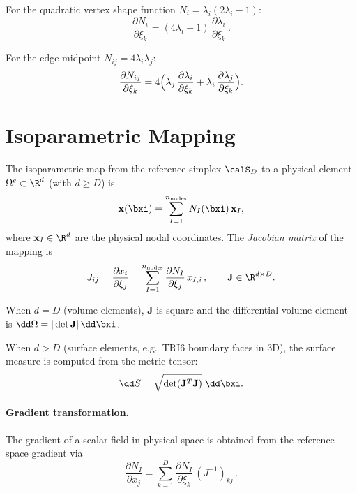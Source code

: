 For the quadratic vertex shape function $N_i = \lambda_i(2\lambda_i - 1)$:
\begin{equation}
  \frac{\partial N_i}{\partial \xi_k}
  = (4\lambda_i - 1)\,\frac{\partial \lambda_i}{\partial \xi_k}\,.
  \label{eq:dNi_vertex}
\end{equation}

For the edge midpoint $N_{ij} = 4\lambda_i\lambda_j$:
\begin{equation}
  \frac{\partial N_{ij}}{\partial \xi_k}
  = 4\Bigl(
    \lambda_j\,\frac{\partial \lambda_i}{\partial \xi_k}
  + \lambda_i\,\frac{\partial \lambda_j}{\partial \xi_k}
  \Bigr).
  \label{eq:dNij_edge}
\end{equation}


\section{Isoparametric Mapping}
\label{sec:isoparametric}

The isoparametric map from the reference simplex $\calS_D$ to a physical
element $\Omega^e \subset \R^d$ (with $d \ge D$) is
\begin{equation}
  \mathbf{x}(\bxi)
  = \sum_{I=1}^{n_{\text{nodes}}} N_I(\bxi)\,\mathbf{x}_I,
  \label{eq:isoparametric_map}
\end{equation}
where $\mathbf{x}_I \in \R^d$ are the physical nodal coordinates.  The
\emph{Jacobian matrix} of the mapping is
\begin{equation}
  J_{ij} = \frac{\partial x_i}{\partial \xi_j}
         = \sum_{I=1}^{n_{\text{nodes}}}
           \frac{\partial N_I}{\partial \xi_j}\, x_{I,i}\,,
  \qquad
  \mathbf{J} \in \R^{d \times D}.
  \label{eq:jacobian}
\end{equation}

When $d = D$ (volume elements), $\mathbf{J}$ is square and the differential
volume element is $\dd\Omega = |\det\mathbf{J}|\,\dd\bxi$.

When $d > D$ (surface elements, e.g.\ TRI6 boundary faces in 3D), the surface
measure is computed from the metric tensor:
\begin{equation}
  \dd S = \sqrt{\det(\mathbf{J}^T \mathbf{J})}\;\dd\bxi.
  \label{eq:surface_measure}
\end{equation}

\paragraph{Gradient transformation.}
The gradient of a scalar field in physical space is obtained from the
reference-space gradient via
\begin{equation}
  \frac{\partial N_I}{\partial x_j}
  = \sum_{k=1}^{D} \frac{\partial N_I}{\partial \xi_k}\,
    (J^{-1})_{kj}\,.
  \label{eq:grad_transform}
\end{equation}


